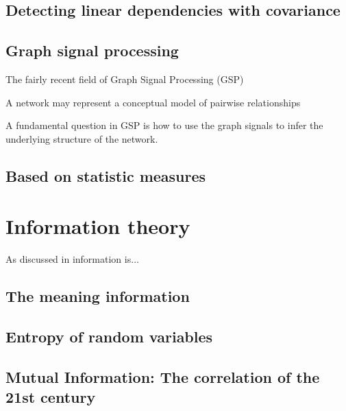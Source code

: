 \subsection{Detecting linear dependencies with covariance}
\subsection{Graph signal processing}
The fairly recent field of Graph Signal Processing (GSP) \cite{Mateos2019ConnectingdotsIdentifying}


A network may represent a conceptual model of pairwise relationships

A fundamental question in GSP is how to use the graph signals to infer the underlying structure of the network.

\subsection{Based on statistic measures}

\section{Information theory}
As discussed in \cite{Cover1999Elementsinformationtheory} information is$\ldots$

\subsection{The meaning information}
\subsection{Entropy of random variables}
\subsection{Mutual Information: The correlation of the 21st century }
